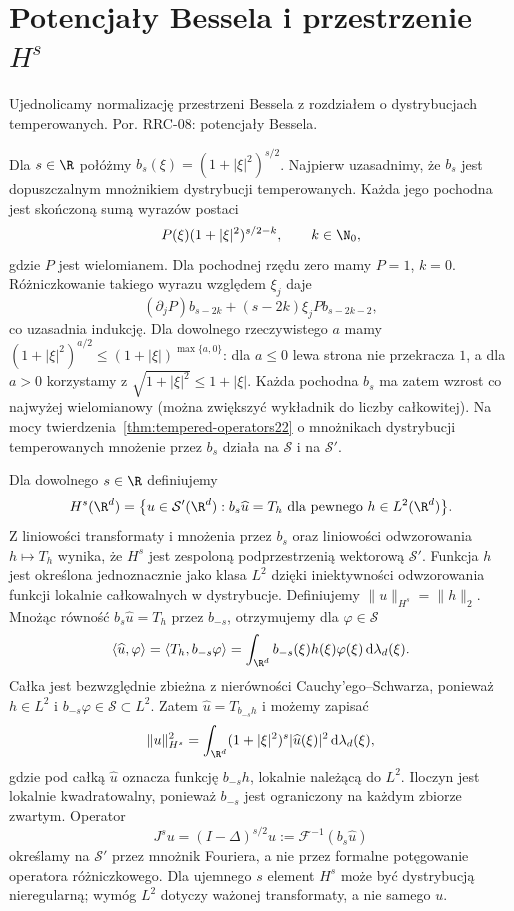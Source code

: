 \setcounter{section}{28}
\section{Potencjały Bessela i przestrzenie \texorpdfstring{$H^s$}{Hs}}
\label{sec:dt-bessel}
\providecommand{\atlasref}[2]{#2}

Ujednolicamy normalizację przestrzeni Bessela z rozdziałem
o dystrybucjach temperowanych. Por.
\atlasref{PDE-08::thm:pde8-Hs}{RRC-08: potencjały Bessela}.


Dla $s\in\R$ połóżmy $b_s(\xi)=(1+|\xi|^2)^{s/2}$.
Najpierw uzasadnimy, że $b_s$ jest dopuszczalnym
mnożnikiem dystrybucji temperowanych.
Każda jego pochodna jest skończoną sumą wyrazów
postaci
\[
 P(\xi)(1+|\xi|^2)^{s/2-k},
 \qquad k\in\N_0,
\]
gdzie $P$ jest wielomianem. Dla pochodnej rzędu
zero mamy $P=1$, $k=0$. Różniczkowanie takiego
wyrazu względem $\xi_j$ daje
\[
 (\partial_j P)b_{s-2k}
 +(s-2k)\xi_j P b_{s-2k-2},
\]
co uzasadnia indukcję.
Dla dowolnego rzeczywistego $a$ mamy
$(1+|\xi|^2)^{a/2}\le(1+|\xi|)^{\max\{a,0\}}$:
dla $a\le0$ lewa strona nie przekracza $1$,
a dla $a>0$ korzystamy z
$\sqrt{1+|\xi|^2}\le1+|\xi|$.
Każda pochodna $b_s$ ma zatem wzrost co najwyżej
wielomianowy (można zwiększyć wykładnik do
liczby całkowitej). Na mocy twierdzenia~\ref{thm:tempered-operators22}
o mnożnikach dystrybucji temperowanych
mnożenie przez $b_s$ działa na $\mathcal S$
i na $\mathcal S'$.

\begin{definicja}
\label{def:dt-Hs}
Dla dowolnego $s\in\R$ definiujemy
\[
 H^s(\R^d)=\bigl\{u\in\mathcal S'(\R^d):
 b_s\widehat u=T_h\text{ dla pewnego }
 h\in L^2(\R^d)\bigr\}.
\]
Z liniowości transformaty i mnożenia przez $b_s$
oraz liniowości odwzorowania $h\mapsto T_h$
wynika, że $H^s$ jest zespoloną podprzestrzenią
wektorową $\mathcal S'$.
Funkcja $h$ jest określona jednoznacznie jako
klasa $L^2$ dzięki iniektywności odwzorowania
funkcji lokalnie całkowalnych w dystrybucje.
Definiujemy
$\|u\|_{H^s}=\|h\|_2$.
Mnożąc równość $b_s\widehat u=T_h$ przez
$b_{-s}$, otrzymujemy dla $\varphi\in\mathcal S$
\[
 \langle\widehat u,\varphi\rangle
 =\langle T_h,b_{-s}\varphi\rangle
 =\int_{\R^d}b_{-s}(\xi)h(\xi)\varphi(\xi)
 \,\mathrm d\lambda_d(\xi).
\]
Całka jest bezwzględnie zbieżna z nierówności
Cauchy'ego--Schwarza, ponieważ $h\in L^2$
i $b_{-s}\varphi\in\mathcal S\subset L^2$.
Zatem $\widehat u=T_{b_{-s}h}$ i możemy zapisać
\[
 \|u\|_{H^s}^2=\int_{\R^d}
 (1+|\xi|^2)^s|\widehat u(\xi)|^2\,
 \mathrm d\lambda_d(\xi),
\]
gdzie pod całką $\widehat u$ oznacza funkcję
$b_{-s}h$, lokalnie należącą do $L^2$.
Iloczyn jest lokalnie kwadratowalny, ponieważ
$b_{-s}$ jest ograniczony na każdym zbiorze zwartym.
Operator
\[
 J^s u=(I-\Delta)^{s/2}u
 :=\mathcal F^{-1}(b_s\widehat u)
\]
określamy na $\mathcal S'$ przez mnożnik Fouriera,
a nie przez formalne potęgowanie operatora
różniczkowego.
Dla ujemnego $s$ element $H^s$ może być
dystrybucją nieregularną; wymóg $L^2$ dotyczy
ważonej transformaty, a nie samego $u$.
\end{definicja}

